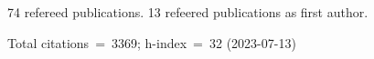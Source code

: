 74 refereed publications. 13 refeered publications as first author.

Total citations~=~3369; h-index~=~32 (2023-07-13)
